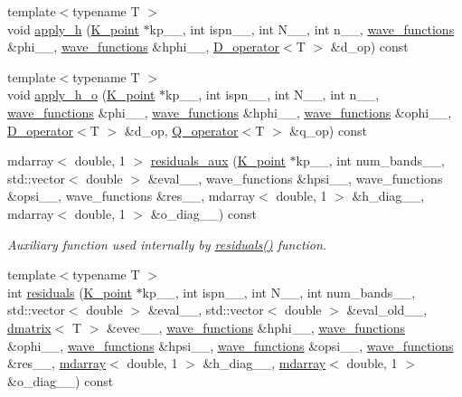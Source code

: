 \begin{DoxyCompactItemize}
\item 
{\footnotesize template$<$typename T $>$ }\\void \hyperlink{classsirius_1_1_band_a3aa9361ef432d4cca5e0047b8bee8e19}{apply\+\_\+h} (\hyperlink{classsirius_1_1_k__point}{K\+\_\+point} $\ast$kp\+\_\+\+\_\+, int ispn\+\_\+\+\_\+, int N\+\_\+\+\_\+, int n\+\_\+\+\_\+, \hyperlink{classsddk_1_1wave__functions}{wave\+\_\+functions} \&phi\+\_\+\+\_\+, \hyperlink{classsddk_1_1wave__functions}{wave\+\_\+functions} \&hphi\+\_\+\+\_\+, \hyperlink{classsirius_1_1_d__operator}{D\+\_\+operator}$<$T $>$ \&d\+\_\+op) const 
\item 
{\footnotesize template$<$typename T $>$ }\\void \hyperlink{classsirius_1_1_band_ac3d1880e4a89fea7c75d6f2ebb8a0edb}{apply\+\_\+h\+\_\+o} (\hyperlink{classsirius_1_1_k__point}{K\+\_\+point} $\ast$kp\+\_\+\+\_\+, int ispn\+\_\+\+\_\+, int N\+\_\+\+\_\+, int n\+\_\+\+\_\+, \hyperlink{classsddk_1_1wave__functions}{wave\+\_\+functions} \&phi\+\_\+\+\_\+, \hyperlink{classsddk_1_1wave__functions}{wave\+\_\+functions} \&hphi\+\_\+\+\_\+, \hyperlink{classsddk_1_1wave__functions}{wave\+\_\+functions} \&ophi\+\_\+\+\_\+, \hyperlink{classsirius_1_1_d__operator}{D\+\_\+operator}$<$T $>$ \&d\+\_\+op, \hyperlink{classsirius_1_1_q__operator}{Q\+\_\+operator}$<$T $>$ \&q\+\_\+op) const 
\item 
mdarray$<$ double, 1 $>$ \hyperlink{classsirius_1_1_band_a21d9bc5434bad3eb35346c6cb37c69eb}{residuals\+\_\+aux} (\hyperlink{classsirius_1_1_k__point}{K\+\_\+point} $\ast$kp\+\_\+\+\_\+, int num\+\_\+bands\+\_\+\+\_\+, std\+::vector$<$ double $>$ \&eval\+\_\+\+\_\+, wave\+\_\+functions \&hpsi\+\_\+\+\_\+, wave\+\_\+functions \&opsi\+\_\+\+\_\+, wave\+\_\+functions \&res\+\_\+\+\_\+, mdarray$<$ double, 1 $>$ \&h\+\_\+diag\+\_\+\+\_\+, mdarray$<$ double, 1 $>$ \&o\+\_\+diag\+\_\+\+\_\+) const 
\begin{DoxyCompactList}\small\item\em Auxiliary function used internally by \hyperlink{classsirius_1_1_band_a67420feea6fe0b7ddfa9bef5652a6d6c}{residuals()} function. \end{DoxyCompactList}\item 
{\footnotesize template$<$typename T $>$ }\\int \hyperlink{classsirius_1_1_band_a67420feea6fe0b7ddfa9bef5652a6d6c}{residuals} (\hyperlink{classsirius_1_1_k__point}{K\+\_\+point} $\ast$kp\+\_\+\+\_\+, int ispn\+\_\+\+\_\+, int N\+\_\+\+\_\+, int num\+\_\+bands\+\_\+\+\_\+, std\+::vector$<$ double $>$ \&eval\+\_\+\+\_\+, std\+::vector$<$ double $>$ \&eval\+\_\+old\+\_\+\+\_\+, \hyperlink{classsddk_1_1dmatrix}{dmatrix}$<$ T $>$ \&evec\+\_\+\+\_\+, \hyperlink{classsddk_1_1wave__functions}{wave\+\_\+functions} \&hphi\+\_\+\+\_\+, \hyperlink{classsddk_1_1wave__functions}{wave\+\_\+functions} \&ophi\+\_\+\+\_\+, \hyperlink{classsddk_1_1wave__functions}{wave\+\_\+functions} \&hpsi\+\_\+\+\_\+, \hyperlink{classsddk_1_1wave__functions}{wave\+\_\+functions} \&opsi\+\_\+\+\_\+, \hyperlink{classsddk_1_1wave__functions}{wave\+\_\+functions} \&res\+\_\+\+\_\+, \hyperlink{classsddk_1_1mdarray}{mdarray}$<$ double, 1 $>$ \&h\+\_\+diag\+\_\+\+\_\+, \hyperlink{classsddk_1_1mdarray}{mdarray}$<$ double, 1 $>$ \&o\+\_\+diag\+\_\+\+\_\+) const 

\end{DoxyCompactItemize}
